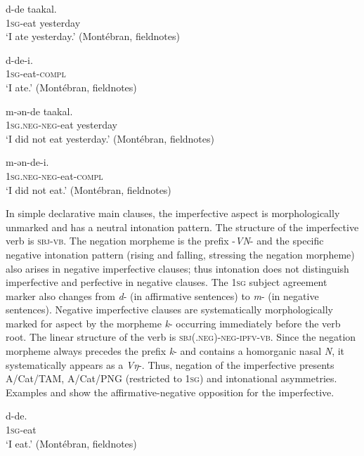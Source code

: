 \documentclass[output=paper,colorlinks,citecolor=brown]{langscibook}
\begin{document}
\ea\label{ex:mank:1}
    \gll d-de taakal.\\ 
         \textsc{1sg}-eat yesterday\\
    \glt ‘I ate yesterday.’ (Montébran, fieldnotes) \\
\z

\ea\label{ex:mank:2}
    \gll d-de-i.\\
         \textsc{1sg}-eat-\textsc{compl}\\
    \glt ‘I ate.’ (Montébran, fieldnotes)
\z

\ea\label{ex:mank:3}
    \gll m-ən-de taakal.\\
         \textsc{1sg.neg-neg-}eat yesterday\\
    \glt ‘I did not eat yesterday.’ (Montébran, fieldnotes)
\z

\ea\label{ex:mank:4}
    \gll m-ən-de-i. \\
        \textsc{1sg.neg-neg-}eat\textsc{{}-compl} \\
    \glt ‘I did not eat.’ (Montébran, fieldnotes)\\
\z

In simple declarative main clauses, the imperfective aspect is morphologically unmarked and has a neutral intonation pattern. The structure of the imperfective verb is \textsc{sbj-vb}. The negation morpheme is the prefix {}-\textit{VN}{}- and the specific negative intonation pattern (rising and falling, stressing the negation morpheme) also arises in negative imperfective clauses; thus intonation does not distinguish imperfective and perfective in negative clauses. The \textsc{1sg} subject agreement marker also changes from \textit{d}{}- (in affirmative sentences) to \textit{m}{}- (in negative sentences). Negative imperfective clauses are systematically morphologically marked for aspect by the morpheme \textit{k}{}- occurring immediately before the verb root. The linear structure of the verb is \textsc{sbj(.neg){}-neg-ipfv-vb}. Since the negation morpheme always precedes the prefix \textit{k}{}- and contains a homorganic nasal \textit{N}, it systematically appears as a \textit{Vŋ}{}-. Thus, negation of the imperfective presents A/Cat/TAM, A/Cat/PNG (restricted to \textsc{1sg}) and intonational asymmetries. Examples  and  show the affirmative-negative opposition for the imperfective. 

\ea\label{ex:mank:5}
    \gll d-de. \\
         \textsc{1sg}-eat \\
    \glt ‘I eat.’ (Montébran, fieldnotes)
\z
\end{document}
